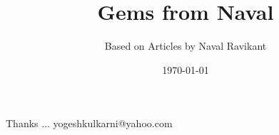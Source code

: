 \documentclass[xcolor=dvipsnames,compress,t,pdf]{beamer}
\title[\hspace{4cm} \insertframenumber /\inserttotalframenumber]
{Gems from Naval}
\subtitle[]{Based on Articles by Naval Ravikant}
\date[2020]{\today}
\begin{document}
\begin{frame}
\titlepage
\end{frame}




\begin{frame}[c]{}
Thanks ...
\vspace{5mm}
yogeshkulkarni@yahoo.com
\end{frame}
\end{document}
